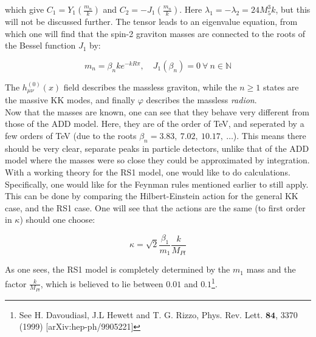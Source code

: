 \documentclass[11pt,a4paper]{article}
\begin{document}
which give $C_1 = Y_1\left(\frac{m_n}{k}\right)$ and $C_2 = -J_1\left(\frac{m_n}{k}\right)$. Here $\lambda_1 = -\lambda_2 = 24M_5^3k$, but this will not be discussed further. The tensor leads to an eigenvalue equation, from which one will find that the spin-2 graviton masses are connected to the roots of the Bessel function $J_1$ by:

\begin{equation}
	m_n = \beta_n ke^{-kR\pi},\quad J_1(\beta_n) = 0 \:\forall\: n\in\mathbb{N}
\end{equation}

The $h_{\mu\nu}^{(0)}(x)$ field describes the massless graviton, while the $n\geq 1$ states are the massive KK modes, and finally $\varphi$ describes the massless \emph{radion}.\\

Now that the masses are known, one can see that they behave very different from those of the ADD model. Here, they are of the order of TeV, and seperated by a few orders of TeV (due to the roots $\beta_n = 3.83,\:7.02,\:10.17,\:\ldots$). This means there should be very clear, separate peaks in particle detectors, unlike that of the ADD model where the masses were so close they could be approximated by integration.\\
With a working theory for the RS1 model, one would like to do calculations. Specifically, one would like for the Feynman rules mentioned earlier to still apply. This can be done by comparing the Hilbert-Einstein action for the general KK case, and the RS1 case. One will see that the actions are the same (to first order in $\kappa$) should one choose:

\begin{equation}
	\kappa = \sqrt{2}\frac{\beta_1}{m_1}\frac{k}{M_{Pl}}
\end{equation}

As one sees, the RS1 model is completely determined by the $m_1$ mass and the factor $\frac{k}{M_{Pl}}$, which is believed to lie between $0.01$ and $0.1$\footnote{See H. Davoudiasl, J.L Hewett and T. G. Rizzo, Phys. Rev. Lett. $\bm{84}$, 3370 (1999) [arXiv:hep-ph/9905221]}.
\end{document}
